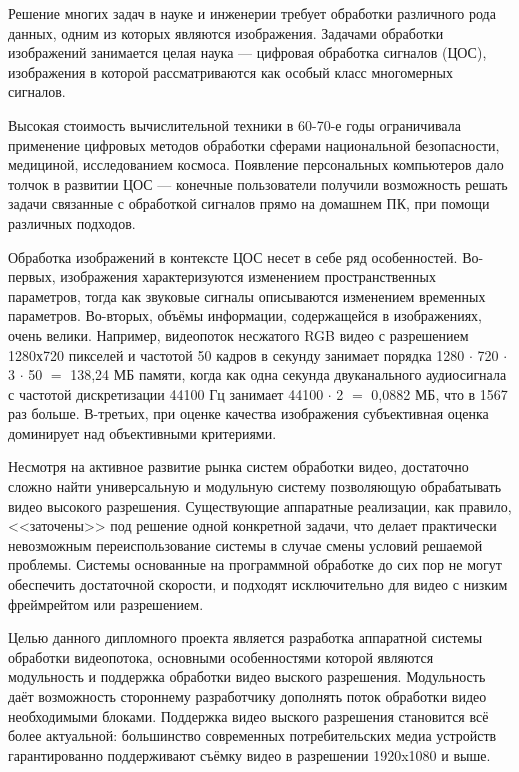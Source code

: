 \label{sec:intro}

Решение многих задач в науке и инженерии требует обработки различного рода данных, одним из которых являются изображения.
Задачами обработки изображений занимается целая наука --- цифровая обработка сигналов (ЦОС),
изображения в которой рассматриваются как особый класс многомерных сигналов.

Высокая стоимость вычислительной техники в 60-70-е годы ограничивала применение
цифровых методов обработки сферами национальной безопасности, медициной, исследованием космоса.
Появление персональных компьютеров дало толчок в развитии ЦОС --- конечные пользователи
получили возможность решать задачи связанные с обработкой сигналов прямо на домашнем ПК,
при помощи различных подходов.

Обработка изображений в контексте ЦОС несет в себе ряд особенностей.
Во-первых, изображения характеризуются изменением пространственных параметров, тогда как звуковые сигналы описываются изменением временных параметров.
Во-вторых, объёмы информации, содержащейся в изображениях, очень велики.
Например, видеопоток несжатого RGB видео
с разрешением 1280х720 пикселей и частотой 50 кадров в секунду
занимает порядка 1280 $\cdot$ 720 $\cdot$ 3 $\cdot$ 50 $=$ 138,24 МБ памяти, когда как одна
секунда двуканального аудиосигнала с частотой дискретизации 44100 Гц
занимает 44100 $\cdot$ 2 $=$ 0,0882 МБ, что в 1567 раз больше. В-третьих, при оценке качества
изображения субъективная оценка доминирует над объективными критериями.

Несмотря на активное развитие рынка систем обработки видео, достаточно сложно найти
универсальную и модульную систему позволяющую обрабатывать видео высокого разрешения.
Существующие аппаратные реализации, как правило, <<заточены>> под решение одной конкретной задачи,
что делает практически невозможным переиспользование системы в случае смены условий решаемой проблемы.
Системы основанные на программной обработке до сих пор не могут обеспечить достаточной скорости, и подходят исключительно для видео с низким фреймрейтом или разрешением. %


Целью данного дипломного проекта является разработка аппаратной системы обработки
видеопотока, основными особенностями которой являются модульность и поддержка
обработки видео выского разрешения. Модульность даёт возможность стороннему
разработчику дополнять поток обработки видео необходимыми блоками.
Поддержка видео выского разрешения становится всё более актуальной:
большинство современных потребительских медиа устройств гарантированно
поддерживают съёмку видео в разрешении 1920x1080 и выше. %


